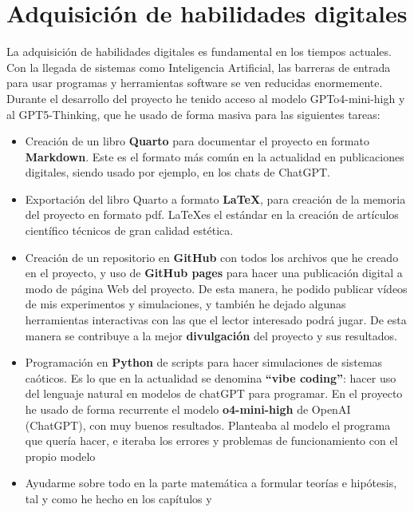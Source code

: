 \documentclass[
  10pt,
  a4paper,
  DIV=11,
  numbers=noendperiod,
  open=any]{scrreprt}
\numberwithin{equation}{chapter}
\numberwithin{equation}{section}
\renewcommand{\[}{\begin{equation}}
\renewcommand{\]}{\end{equation}}
\begin{document}
\section{Adquisición de habilidades
digitales}\label{adquisiciuxf3n-de-habilidades-digitales}

La adquisición de habilidades digitales es fundamental en los tiempos actuales. Con la llegada de sistemas como Inteligencia Artificial, las barreras de entrada para usar programas y herramientas software se ven reducidas enormemente. Durante el desarrollo del proyecto he tenido acceso al modelo GPTo4-mini-high y al GPT5-Thinking, que he usado de forma masiva para las siguientes tareas:

\begin{itemize}
\item
  Creación de un libro \textbf{Quarto} para documentar el proyecto en
  formato \textbf{Markdown}. Este es el formato más común en la
  actualidad en publicaciones digitales, siendo usado por ejemplo, en
  los chats de ChatGPT.
\item
  Exportación del libro Quarto a formato \textbf{\LaTeX}, para creación
  de la memoria del proyecto en formato pdf. \LaTeX es el estándar en la
  creación de artículos científico técnicos de gran calidad estética.
\item
  Creación de un repositorio en \textbf{GitHub} con todos los archivos
  que he creado en el proyecto, y uso de \textbf{GitHub pages} para
  hacer una publicación digital a modo de página Web del proyecto. De
  esta manera, he podido publicar vídeos de mis experimentos y
  simulaciones, y también he dejado algunas herramientas interactivas
  con las que el lector interesado podrá jugar. De esta manera se
  contribuye a la mejor \textbf{divulgación} del proyecto y sus
  resultados.
\item
  Programación en \textbf{Python} de scripts para hacer simulaciones de
  sistemas caóticos. Es lo que en la actualidad se denomina
  \textbf{``vibe coding''}: hacer uso del lenguaje natural en modelos de
  chatGPT para programar. En el proyecto he usado de forma recurrente el
  modelo \textbf{o4-mini-high} de OpenAI (ChatGPT), con muy buenos
  resultados. Planteaba al modelo el programa que quería hacer, e
  iteraba los errores y problemas de funcionamiento con el propio modelo
\item
  Ayudarme sobre todo en la parte matemática a formular teorías e hipótesis, tal y como he hecho en los capítulos  y 
\end{itemize}
\end{document}
